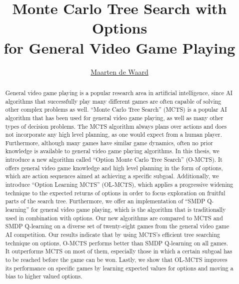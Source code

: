 \documentclass[a4]{report}
\title{Monte Carlo Tree Search with Options\\for General Video Game Playing}
\author{\href{mailto:mrtndwrd@gmail.com}{Maarten de Waard}}
\newcommand\blankpage{%
 \null
 \thispagestyle{empty}%
 \addtocounter{page}{-1}%
 \newpage}
\begin{document}

\maketitle
\blankpage


\begin{abstract}
	General video game playing is a popular research area in artificial
	intelligence, since AI algorithms that successfully play many different
	games are often capable of solving other complex problems as well.  ``Monte
	Carlo Tree Search'' (MCTS) is a popular AI algorithm that has been used for
	general video game playing, as well as many other types of decision
	problems.  The MCTS algorithm always plans over actions and does not
	incorporate any high level planning, as one would expect from a human
	player. Furthermore, although many games have similar game dynamics, often
	no prior knowledge is available to general video game playing algorithms.
	In this thesis, we introduce a new algorithm called ``Option Monte Carlo
	Tree Search'' (O-MCTS). It offers general video game knowledge and high
	level planning in the form of options, which are action sequences aimed at
	achieving a specific subgoal. Additionally, we introduce ``Option Learning
	MCTS'' (OL-MCTS), which applies a progressive widening technique to the
	expected returns of options in order to focus exploration on fruitful parts
	of the search tree. Furthermore, we offer an implementation of ``SMDP
	Q-learning'' for general video game playing, which is the algorithm
	that is traditionally used in combination with options. Our new algorithms
	are compared to MCTS and SMDP Q-learning on a diverse set of twenty-eight
	games from the general video game AI competition. Our results indicate that
	by using MCTS's efficient tree searching technique on options, O-MCTS
	performs better than SMDP Q-learning on all games. It outperforms MCTS on
	most of them, especially those in which a certain subgoal has to be reached
	before the game can be won.  Lastly, we show that OL-MCTS improves its
performance on specific games by learning expected values for options and moving
a bias to higher valued options.  \end{abstract}

\blankpage

\tableofcontents




\end{document}
